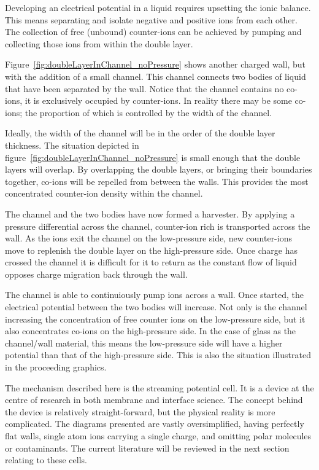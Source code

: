     Developing an electrical potential in a liquid requires upsetting the ionic balance.
    This means separating and isolate negative and positive ions from each other.
    The collection of free (unbound) counter-ions can be achieved by pumping and collecting those ions from within the double layer.

    Figure~\ref{fig:doubleLayerInChannel_noPressure} shows another charged wall, but with the addition of a small channel.
    This channel connects two bodies of liquid that have been separated by the wall.
    Notice that the channel contains no co-ions, it is exclusively occupied by counter-ions.
    In reality there may be some co-ions; the proportion of which is controlled by the width of the channel.

    Ideally, the width of the channel will be in the order of the double layer thickness.
    The situation depicted in figure~\ref{fig:doubleLayerInChannel_noPressure} is small enough that the double layers will overlap.
    By overlapping the double layers, or bringing their boundaries together, co-ions will be repelled from between the walls.
    This provides the most concentrated counter-ion density within the channel.

    The channel and the two bodies have now formed a harvester.
    By applying a pressure differential across the channel, counter-ion rich is transported across the wall.
    As the ions exit the channel on the low-pressure side, new counter-ions move to replenish the double layer on the high-pressure side.
    Once charge has crossed the channel it is difficult for it to return as the constant flow of liquid opposes charge migration back through the wall.
    
    The channel is able to continuiously pump ions across a wall.
    Once started, the electrical potential between the two bodies will increase.
    Not only is the channel increasing the concentration of free counter ions on the low-pressure side, but it also concentrates co-ions on the high-pressure side.
    In the case of glass as the channel/wall material, this means the low-pressure side will have a higher potential than that of the high-pressure side.
    This is also the situation illustrated in the proceeding graphics.

    The mechanism described here is the streaming potential cell.
    It is a device at the centre of research in both membrane and interface science.
    The concept behind the device is relatively straight-forward, but the physical reality is more complicated.
    The diagrams presented are vastly oversimplified, having perfectly flat walls, single atom ions carrying a single charge, and omitting polar molecules or contaminants.
    The current literature will be reviewed in the next section relating to these cells.

